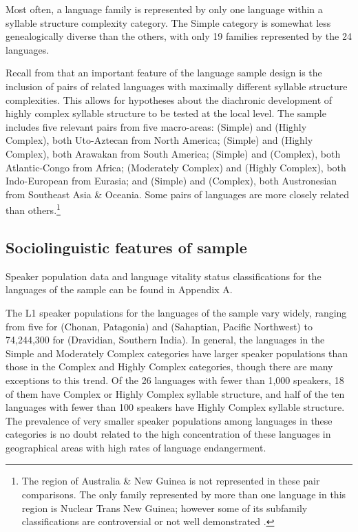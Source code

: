   Most often, a language family is represented by only one language within a syllable structure complexity category. The Simple category is somewhat less genealogically diverse than the others, with only 19 families represented by the 24 languages.

  Recall from  that an important feature of the language sample design is the inclusion of pairs of related languages with maximally different syllable structure complexities. This allows for hypotheses about the diachronic development of highly complex syllable structure to be tested at the local level. The sample includes five relevant pairs from five macro-areas:  (Simple) and  (Highly Complex), both Uto-Aztecan from North America;  (Simple) and  (Highly Complex), both Arawakan from South America;  (Simple) and  (Complex), both Atlantic-Congo from Africa;  (Moderately Complex) and  (Highly Complex), both Indo-European from Eurasia; and  (Simple) and  (Complex), both Austronesian from Southeast Asia \& Oceania. Some pairs of languages are more closely related than others.\footnote{{The region of Australia \& New Guinea is not represented in these pair comparisons. The only family represented by more than one language in this region is Nuclear Trans New Guinea; however some of its subfamily classifications are controversial or not well demonstrated \citep{Pawley2005}.}}

\subsection{Sociolinguistic features of sample}\label{sec:2.4.3}

  Speaker population data and language vitality status classifications for the languages of the sample can be found in Appendix A.

  The L1 speaker populations for the languages of the sample vary widely, ranging from five for  (Chonan, Patagonia) and  (Sahaptian, Pacific Northwest) to 74,244,300 for  (Dravidian, Southern India). In general, the languages in the Simple and Moderately Complex categories have larger speaker populations than those in the Complex and Highly Complex categories, though there are many exceptions to this trend. Of the 26 languages with fewer than 1,000 speakers, 18 of them have Complex or Highly Complex syllable structure, and half of the ten languages with fewer than 100 speakers have Highly Complex syllable structure. The prevalence of very smaller speaker populations among languages in these categories is no doubt related to the high concentration of these languages in geographical areas with high rates of language endangerment.

